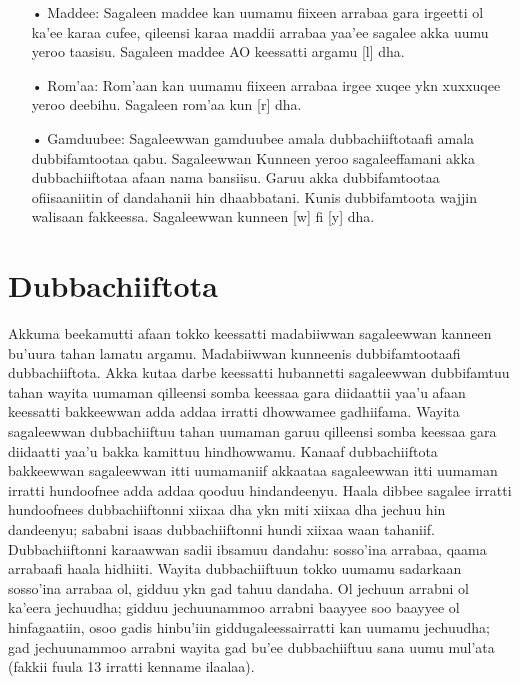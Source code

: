 \documentclass[11pt,b5paper]{book}
\begin{document}
\begin{itemize}
\item[•] Maddee: Sagaleen maddee kan uumamu fiixeen arrabaa gara irgeetti ol ka’ee karaa cufee, qileensi karaa maddii arrabaa yaa’ee sagalee akka uumu yeroo taasisu.  Sagaleen maddee AO keessatti argamu [l] dha. 

\item[•] Rom’aa: Rom’aan kan uumamu fiixeen arrabaa irgee xuqee ykn xuxxuqee yeroo deebihu.  Sagaleen rom’aa kun [r] dha. 

\item[•] Gamduubee: Sagaleewwan gamduubee amala dubbachiiftotaafi amala dubbifamtootaa qabu.  Sagaleewwan Kunneen yeroo sagaleeffamani akka dubbachiiftotaa afaan nama bansiisu.  Garuu akka dubbifamtootaa ofiisaaniitin of dandahanii hin dhaabbatani.  Kunis dubbifamtoota wajjin walisaan fakkeessa.  Sagaleewwan kunneen [w] fi [y] dha. 

\end{itemize}

\section{Dubbachiiftota}

Akkuma beekamutti afaan tokko keessatti madabiiwwan sagaleewwan kanneen bu'uura tahan lamatu argamu.  Madabiiwwan kunneenis dubbifamtootaafi dubbachiiftota.  Akka kutaa darbe keessatti hubannetti sagaleewwan  dubbifamtuu tahan wayita uumaman qilleensi somba keessaa  gara diidaattii yaa'u afaan keessatti bakkeewwan adda addaa  irratti dhowwamee gadhiifama. Wayita sagaleewwan  dubbachiiftuu tahan uumaman garuu qilleensi somba keessaa  gara diidaatti yaa'u bakka kamittuu hindhowwamu. Kanaaf  dubbachiiftota bakkeewwan sagaleewwan itti uumamaniif  akkaataa sagaleewwan itti uumaman irratti hundoofnee adda  addaa qooduu hindandeenyu. Haala dibbee sagalee irratti  hundoofnees dubbachiiftonni xiixaa dha ykn miti xiixaa dha  jechuu hin dandeenyu; sababni isaas dubbachiiftonni hundi  xiixaa waan tahaniif. Dubbachiiftonni karaawwan sadii ibsamuu  dandahu: sosso'ina arrabaa, qaama arrabaafi haala hidhiiti.  Wayita dubbachiiftuun tokko uumamu sadarkaan sosso'ina  arrabaa ol, gidduu ykn gad tahuu dandaha. Ol jechuun arrabni  ol ka'eera jechuudha; gidduu jechuunammoo arrabni baayyee soo baayyee ol hinfagaatiin, osoo gadis hinbu'iin  giddugaleessairratti kan uumamu jechuudha; gad  jechuunammoo arrabni wayita gad bu'ee dubbachiiftuu sana  uumu mul'ata (fakkii fuula 13 irratti kenname ilaalaa). 
\end{document}
